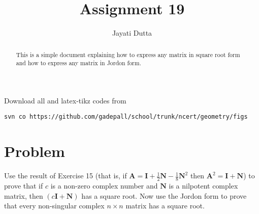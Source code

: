 \documentclass[journal,12pt,onecolumn]{IEEEtran}
\begin{document}
\let\StandardTheFigure\thefigure
\let\vec\mathbf
\renewcommand{\thefigure}{\theproblem}



\def\putbox#1#2#3{\makebox[0in][l]{\makebox[#1][l]{}\raisebox{\baselineskip}[0in][0in]{\raisebox{#2}[0in][0in]{#3}}}}
     \def\rightbox#1{\makebox[0in][r]{#1}}
     \def\centbox#1{\makebox[0in]{#1}}
     \def\topbox#1{\raisebox{-\baselineskip}[0in][0in]{#1}}
     \def\midbox#1{\raisebox{-0.5\baselineskip}[0in][0in]{#1}}

\vspace{3cm}


\title{Assignment 19}
\author{Jayati Dutta}





\maketitle



\bigskip

\renewcommand{\thefigure}{\theenumi}
\renewcommand{\thetable}{\theenumi}


\begin{abstract}
This is a simple document explaining how to express any matrix in square root form and how to express any matrix in Jordon form.
\end{abstract}

%

Download all and latex-tikz codes from 
%
\begin{lstlisting}
svn co https://github.com/gadepall/school/trunk/ncert/geometry/figs
\end{lstlisting}
%


\section{Problem}
Use the result of Exercise 15 (that is, if $\vec{A}=\vec{I}+\frac{1}{2}\vec{N}-\frac{1}{8}\vec{N}^2$ then $\vec{A}^2 = \vec{I}+\vec{N}$) to prove that if $c$ is a non-zero complex number and $\vec{N}$ is a nilpotent complex matrix, then $(c\vec{I}+\vec{N})$ has a square root. Now use the Jordon form to prove that every non-singular complex $n \times n$ matrix has a square root.
 
\end{document}
